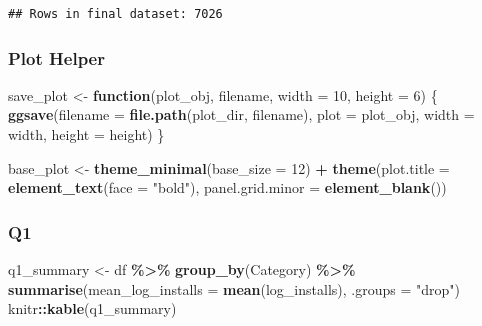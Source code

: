 \documentclass[
]{article}
\newenvironment{Shaded}{\begin{snugshade}}{\end{snugshade}}
\newcommand{\AttributeTok}[1]{\textcolor[rgb]{0.13,0.29,0.53}{#1}}
\newcommand{\ControlFlowTok}[1]{\textcolor[rgb]{0.13,0.29,0.53}{\textbf{#1}}}
\newcommand{\DecValTok}[1]{\textcolor[rgb]{0.00,0.00,0.81}{#1}}
\newcommand{\FunctionTok}[1]{\textcolor[rgb]{0.13,0.29,0.53}{\textbf{#1}}}
\newcommand{\NormalTok}[1]{#1}
\newcommand{\OtherTok}[1]{\textcolor[rgb]{0.56,0.35,0.01}{#1}}
\newcommand{\SpecialCharTok}[1]{\textcolor[rgb]{0.81,0.36,0.00}{\textbf{#1}}}
\newcommand{\StringTok}[1]{\textcolor[rgb]{0.31,0.60,0.02}{#1}}
\begin{document}
\begin{verbatim}
## Rows in final dataset: 7026
\end{verbatim}

\subsubsection{Plot Helper}\label{plot-helper}

\begin{Shaded}
\begin{Highlighting}[]
\NormalTok{save\_plot }\OtherTok{\textless{}{-}} \ControlFlowTok{function}\NormalTok{(plot\_obj, filename, }\AttributeTok{width =} \DecValTok{10}\NormalTok{, }\AttributeTok{height =} \DecValTok{6}\NormalTok{) \{}
    \FunctionTok{ggsave}\NormalTok{(}\AttributeTok{filename =} \FunctionTok{file.path}\NormalTok{(plot\_dir, filename), }\AttributeTok{plot =}\NormalTok{ plot\_obj, }\AttributeTok{width =}\NormalTok{ width, }\AttributeTok{height =}\NormalTok{ height)}
\NormalTok{\}}

\NormalTok{base\_plot }\OtherTok{\textless{}{-}} \FunctionTok{theme\_minimal}\NormalTok{(}\AttributeTok{base\_size =} \DecValTok{12}\NormalTok{) }\SpecialCharTok{+}
    \FunctionTok{theme}\NormalTok{(}\AttributeTok{plot.title =} \FunctionTok{element\_text}\NormalTok{(}\AttributeTok{face =} \StringTok{"bold"}\NormalTok{), }\AttributeTok{panel.grid.minor =} \FunctionTok{element\_blank}\NormalTok{())}
\end{Highlighting}
\end{Shaded}

\subsubsection{Q1}\label{q1}

\begin{Shaded}
\begin{Highlighting}[]
\NormalTok{q1\_summary }\OtherTok{\textless{}{-}}\NormalTok{ df }\SpecialCharTok{\%\textgreater{}\%} \FunctionTok{group\_by}\NormalTok{(Category) }\SpecialCharTok{\%\textgreater{}\%} \FunctionTok{summarise}\NormalTok{(}\AttributeTok{mean\_log\_installs =} \FunctionTok{mean}\NormalTok{(log\_installs), }\AttributeTok{.groups =} \StringTok{"drop"}\NormalTok{)}
\NormalTok{knitr}\SpecialCharTok{::}\FunctionTok{kable}\NormalTok{(q1\_summary)}
\end{Highlighting}
\end{Shaded}
\end{document}
